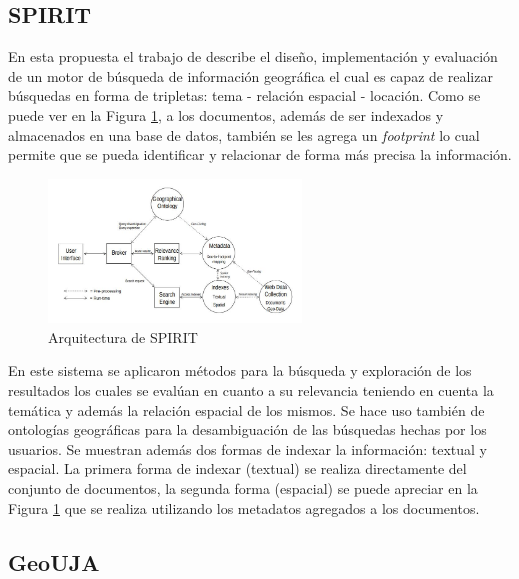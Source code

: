 \documentclass{llncs}
\begin{document}
\subsection{SPIRIT}\label{sec:archspirit}

En esta propuesta el trabajo de \cite{purves2007} describe el diseño,
implementación y evaluación de un motor de búsqueda de información geográfica
el cual es capaz de realizar búsquedas en forma de tripletas: tema - relación
espacial - locación. Como se puede ver en la Figura \ref{fig:archspirit}, a los
documentos, además de ser indexados y almacenados en una base de datos, también
se les agrega un \emph{footprint} lo cual permite que se pueda identificar y
relacionar de forma más precisa la información.

\begin{figure}[htb]%
	\begin{center}
		\includegraphics[width=0.6\textwidth]{spirit_arch.jpg}
	\end{center}
	\caption{Arquitectura de SPIRIT \cite{purves2007}}
	\label{fig:archspirit}
\end{figure}

En este sistema se aplicaron métodos para la búsqueda y exploración de los
resultados los cuales se evalúan en cuanto a su relevancia teniendo en cuenta
la temática y además la relación espacial de los mismos. Se hace uso también de
ontologías geográficas para la desambiguación de las búsquedas hechas por los
usuarios. Se muestran además dos formas de indexar la información: textual y
espacial. La primera forma de indexar (textual) se realiza directamente del
conjunto de documentos, la segunda forma (espacial) se puede apreciar en la
Figura \ref{fig:archspirit} que se realiza utilizando los metadatos agregados a
los documentos.

\newpage

\subsection{GeoUJA}\label{sec:archgeouja}
\end{document}
